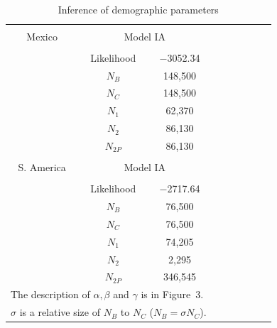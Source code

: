 \clearpage




\renewcommand{\arraystretch}{1.1}
\begin{table}[h]

\begin{center}
 \caption[]{Inference of demographic parameters\hspace*{0.3cm}}
  \textbf{}\\[-2mm]
{\fontsize{8}{11}\sf
    \begin{tabular}{ccccccccl} \hline\hline
       & & \\[-3mm]
     Mexico  & \multicolumn{2}{c}{Model IA}  \\[0.1cm]
    \hline
    & & \\[-3mm]
   & Likelihood & $-$3052.34  \\
  &$N_B$ & 148,500 \\
  &$N_C$ & 148,500 \\   
  &$N_1$ & 62,370 \\ 
  &$N_2$ & 86,130 \\ 
  &$N_{2P}$   & 86,130    \\ 
      \hline
    & & \\[-3mm]
    S. America  & \multicolumn{2}{c}{Model IA}  \\[0.1cm]
        \hline
    & & \\[-3mm]
     & Likelihood &  $-$2717.64  \\
       &$N_B$ & 76,500 \\     	
       &$N_C$ & 76,500 \\
      &$N_1$ & 74,205           \\ 
      &$N_2$ & 2,295       \\      
      &$N_{2P}$   & 346,545   \\[1mm]
    \hline\hline
\multicolumn{3}{l}{The description of $\alpha, \beta$ and $\gamma$ is in Figure~3.}\\
\multicolumn{3}{l}{$\sigma$ is a relative size of $N_B$ to $N_C$ ($N_B=\sigma N_C$).}\\
    \end{tabular}
    \label{supp:param}  %
}
\end{center}
\end{table}
\renewcommand{\arraystretch}{1}


